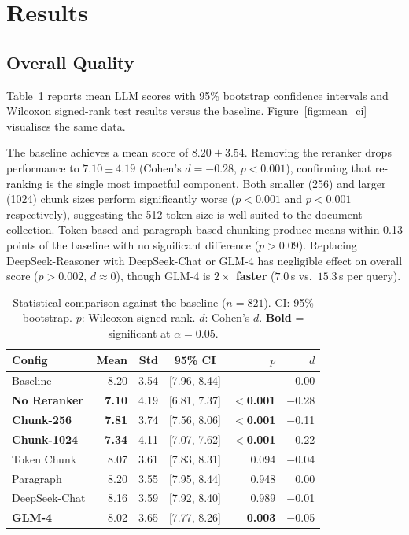 \documentclass[10pt,twocolumn]{article}
\begin{document}
\section{Results}

\subsection{Overall Quality}

Table~\ref{tab:results} reports mean LLM scores with 95\% bootstrap confidence
intervals and Wilcoxon signed-rank test results versus the baseline.
Figure~\ref{fig:mean_ci} visualises the same data.

The baseline achieves a mean score of $8.20 \pm 3.54$.
Removing the reranker drops performance to $7.10 \pm 4.19$
(Cohen's $d{=}{-}0.28$, $p{<}0.001$), confirming that re-ranking is the
single most impactful component.
Both smaller (256) and larger (1024) chunk sizes perform significantly worse
($p{<}0.001$ and $p{<}0.001$ respectively), suggesting the 512-token size is
well-suited to the document collection.
Token-based and paragraph-based chunking produce means within 0.13
points of the baseline with no significant difference ($p>0.09$).
Replacing DeepSeek-Reasoner with DeepSeek-Chat or GLM-4 has negligible effect
on overall score ($p>0.002$, $d{\approx}0$), though GLM-4 is
\textbf{$2\times$ faster} ($7.0$\,s vs.\ $15.3$\,s per query).

\begin{table}[h]
\centering\small
\setlength{\tabcolsep}{4pt}
\caption{Statistical comparison against the baseline ($n{=}821$).
  CI: 95\% bootstrap. $p$: Wilcoxon signed-rank.
  $d$: Cohen's $d$. \textbf{Bold} = significant at $\alpha{=}0.05$.}
\label{tab:results}
\begin{tabular}{@{}lrrcrr@{}}
\toprule
\textbf{Config} & \textbf{Mean} & \textbf{Std} & \textbf{95\% CI} &
  \textbf{$p$} & \textbf{$d$} \\
\midrule
Baseline       & 8.20 & 3.54 & [7.96, 8.44]  & ---       &  0.00 \\
\textbf{No Reranker}  & \textbf{7.10} & 4.19 & [6.81, 7.37] & \textbf{$<$0.001} & $-$0.28 \\
\textbf{Chunk-256}    & \textbf{7.81} & 3.74 & [7.56, 8.06] & \textbf{$<$0.001} & $-$0.11 \\
\textbf{Chunk-1024}   & \textbf{7.34} & 4.11 & [7.07, 7.62] & \textbf{$<$0.001} & $-$0.22 \\
Token Chunk    & 8.07 & 3.61 & [7.83, 8.31]  & 0.094     & $-$0.04 \\
Paragraph      & 8.20 & 3.55 & [7.95, 8.44]  & 0.948     &  0.00 \\
DeepSeek-Chat  & 8.16 & 3.59 & [7.92, 8.40]  & 0.989     & $-$0.01 \\
\textbf{GLM-4} & 8.02 & 3.65 & [7.77, 8.26]  & \textbf{0.003}    & $-$0.05 \\
\bottomrule
\end{tabular}
\end{table}
\end{document}
